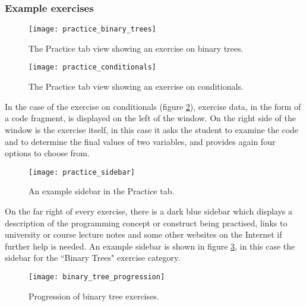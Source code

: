 \newpage
\subsubsection{Example exercises}
\begin{figure}[H]
\centering
\texttt{[image: practice\_binary\_trees]}
\caption{The Practice tab view showing an exercise on binary trees.}
\label{fig:practice_binary_trees}
\end{figure}

\begin{figure}[H]
\centering
\texttt{[image: practice\_conditionals]}
\caption{The Practice tab view showing an exercise on conditionals.}
\label{fig:practice_conditionals}
\end{figure}
\newpage

In the case of the exercise on conditionals (figure \ref{fig:practice_conditionals}), exercise data, in the form of a code fragment, is displayed on the left of the window. On the right side of the window is the exercise itself, in this case it asks the student to examine the code and to determine the final values of two variables, and provides again four options to choose from.

\begin{figure}[H]
\centering
\texttt{[image: practice\_sidebar]}
\caption{An example sidebar in the Practice tab.}
\label{fig:practice_sidebar}
\end{figure}

On the far right of every exercise, there is a dark blue sidebar which displays a description of the programming concept or construct being practised, links to university or course lecture notes and some other websites on the Internet if further help is needed. An example sidebar is shown in figure \ref{fig:practice_sidebar}, in this case the sidebar for the ``Binary Trees" exercise category.


\newpage
\begin{figure}[H]
\centering
\texttt{[image: binary\_tree\_progression]}
\caption{Progression of binary tree exercises.}
\label{fig:binary_tree_progression}
\end{figure}

